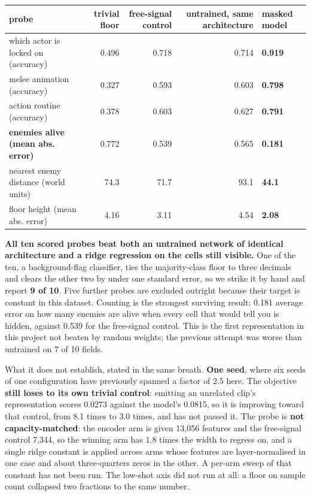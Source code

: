 \documentclass[11pt]{article}
\begin{document}
\begin{table}[!htbp]
  \centering
  \label{tab:frozenprobesonthemaskedpredi}
\begin{center}\small
\begin{tabularx}{\linewidth}{@{}XrrrX@{}}
\toprule
\textbf{probe} & \textbf{trivial floor} & \textbf{free-signal control} & \textbf{untrained, same architecture} & \textbf{masked model} \\
\midrule
which actor is locked on (accuracy) & 0.496 & 0.718 & 0.714 & \textbf{0.919} \\
melee animation (accuracy) & 0.327 & 0.593 & 0.603 & \textbf{0.798} \\
action routine (accuracy) & 0.378 & 0.603 & 0.627 & \textbf{0.791} \\
\textbf{enemies alive (mean abs. error)} & 0.772 & 0.539 & 0.565 & \textbf{0.181} \\
nearest enemy distance (world units) & 74.3 & 71.7 & 93.1 & \textbf{44.1} \\
floor height (mean abs. error) & 4.16 & 3.11 & 4.54 & \textbf{2.08} \\
\bottomrule
\end{tabularx}
\end{center}
\end{table}

\textbf{All ten scored probes beat both an untrained network of identical architecture and a ridge regression on the cells still visible.} One of the ten, a background-flag classifier, ties the majority-class floor to three decimals and clears the other two by under one standard error, so we strike it by hand and report \textbf{9 of 10}. Five further probes are excluded outright because their target is constant in this dataset. Counting is the strongest surviving result: 0.181 average error on how many enemies are alive when every cell that would tell you is hidden, against 0.539 for the free-signal control. This is the first representation in this project not beaten by random weights; the previous attempt was worse than untrained on 7 of 10 fields.

What it does not establish, stated in the same breath. \textbf{One seed}, where six seeds of one configuration have previously spanned a factor of 2.5 here. The objective \textbf{still loses to its own trivial control}: emitting an unrelated clip's representation scores 0.0273 against the model's 0.0815, so it is improving toward that control, from 8.1 times to 3.0 times, and has not passed it. The probe is \textbf{not capacity-matched}: the encoder arm is given 13,056 features and the free-signal control 7,344, so the winning arm has 1.8 times the width to regress on, and a single ridge constant is applied across arms whose features are layer-normalised in one case and about three-quarters zeros in the other. A per-arm sweep of that constant has not been run. The low-shot axis did not run at all: a floor on sample count collapsed two fractions to the same number.
\end{document}

